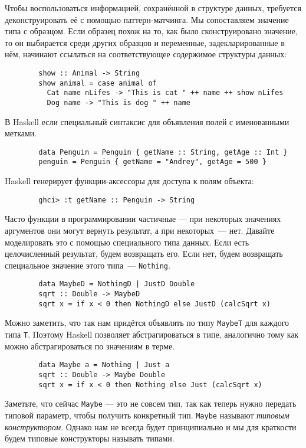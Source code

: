 \documentclass[12pt]{article}
\newcommand{\point}[1]{{\color{blue}\textit{#1}}} %
\begin{document}
    Чтобы воспользоваться информацией, сохранённой в структуре данных, требуется деконструировать её с помощью паттерн-матчинга.
    Мы сопоставляем значение типа с образцом.
    Если образец похож на то, как было сконструировано значение, то он выбирается среди других образцов и переменные, задекларированные в нём, начинают ссылаться на соответствующее содержимое структуры данных:
    \begin{verbatim}
        show :: Animal -> String
        show animal = case animal of
          Cat name nLifes -> "This is cat " ++ name ++ show nLifes
          Dog name -> "This is dog " ++ name
    \end{verbatim}

    В Haskell если специальный синтаксис для объявления полей с именованными метками.
    \begin{verbatim}
        data Penguin = Penguin { getName :: String, getAge :: Int }
        penguin = Penguin { getName = "Andrey", getAge = 500 }
    \end{verbatim}
    Haskell генерирует функции-аксессоры для доступа к полям объекта:
    \begin{verbatim}
        ghci> :t getName :: Penguin -> String
    \end{verbatim}

    Часто функции в программировании частичные --- при некоторых значениях аргументов они могут вернуть результат, а при некоторых~--- нет.
    Давайте моделировать это с помощью специального типа данных.
    Если есть целочисленный результат, будем возвращать его.
    Если нет, будем возвращать специальное значение этого типа~--- \texttt{Nothing}.
    \begin{verbatim}
        data MaybeD = NothingD | JustD Double
        sqrt :: Double -> MaybeD
        sqrt x = if x < 0 then NothingD else JustD (calcSqrt x)
    \end{verbatim}

    Можно заметить, что так нам придётся объявлять по типу \texttt{MaybeT} для каждого типа \texttt{T}.
    Поэтому Haskell позволяет абстрагироваться в типе, аналогично тому как можно абстрагироваться по значениям в терме.
    \begin{verbatim}
        data Maybe a = Nothing | Just a
        sqrt :: Double -> Maybe Double
        sqrt x = if x < 0 then Nothing else Just (calcSqrt x)
    \end{verbatim}

    Заметьте, что сейчас \texttt{Maybe} --- это не совсем тип, так как теперь нужно передать типовой параметр, чтобы получить конкретный тип.
    \texttt{Maybe} называют \point{типовым конструктором}.
    Однако нам не всегда будет принципиально и мы для краткости будем типовые конструкторы называть типами.
\end{document}
